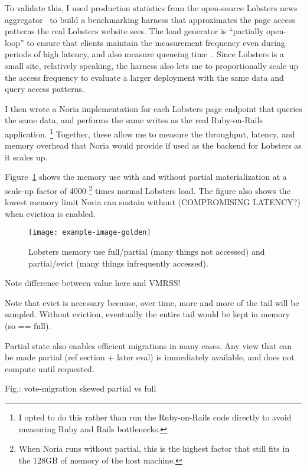 To validate this, I used production statistics from the open-source Lobsters
news aggregator~\cite{lobsters,lobsters-data} to build a benchmarking harness
that approximates the page access patterns the real Lobsters website sees. The
load generator is ``partially open-loop'' to ensure that clients maintain the
measurement frequency even during periods of high latency, and also measure
queueing time~\cite{frank-open-loop,open-loop-cautionary-tale}. Since Lobsters
is a small site, relatively speaking, the harness also lets me to proportionally
scale up the access frequency to evaluate a larger deployment with the same
data and query access patterns.

I then wrote a Noria implementation for each Lobsters page endpoint that
queries the same data, and performs the same writes as the real Ruby-on-Rails
application.%
\footnote{I opted to do this rather than run the Ruby-on-Rails code directly to
avoid measuring Ruby and Rails bottlenecks.}
Together, these allow me to measure the throughput, latency, and memory overhead
that Noria would provide if used as the backend for Lobsters as it scales up.

Figure~\ref{f:lobsters-memory} shows the memory use with and without partial
materialization at a scale-up factor of 4000%
\footnote{When Noria runs without partial, this is the highest factor that still
fits in the 128GB of memory of the host machine.}
times normal Lobsters load. The figure also shows the lowest memory limit Noria
can sustain without (COMPROMISING LATENCY?) when eviction is enabled.

\begin{figure}[t]
  \centering
  \texttt{[image: example-image-golden]}
  \caption{Lobsters memory use full/partial (many things not accessed) and partial/evict (many things infrequently accessed).}
  \label{f:lobsters-memory}
\end{figure}

Note difference between value here and VMRSS!

Note that evict is necessary because, over time, more and more of the
tail will be sampled. Without eviction, eventually the entire tail would
be kept in memory (so == full).

Partial state also enables efficient migrations in many cases. Any view
that can be made partial (ref section + later eval) is immediately
available, and does not compute until requested.

Fig.: vote-migration skewed partial vs full

